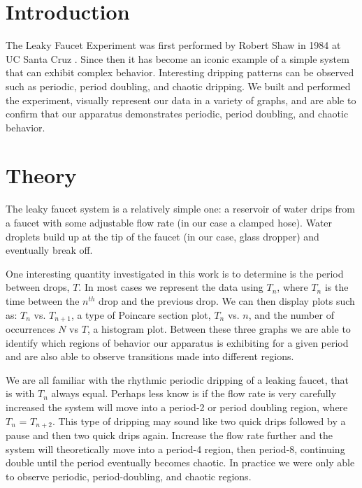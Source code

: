 \documentclass[11pt]{article}
\begin{document}
\section{Introduction} 

The Leaky Faucet Experiment was first performed by Robert Shaw in 1984 at UC Santa Cruz \cite{shaw}. Since then it has become an iconic example of a simple system that can exhibit complex behavior.  Interesting dripping patterns can be observed such as periodic, period doubling, and chaotic dripping. We built and performed the experiment, visually represent our data in a variety of graphs, and are able to confirm that our apparatus demonstrates periodic, period doubling, and chaotic behavior.



\section{Theory}
The leaky faucet system is a relatively simple one: a reservoir of water drips from a faucet with some adjustable flow rate (in our case a clamped hose). Water droplets build up at the tip of the faucet (in our case, glass dropper) and eventually break off.

One interesting quantity investigated in this work is to determine is the period between drops, $T$. In most cases we represent the data using $T_n$,  where $T_n$ is the time between the $n^{th}$ drop and the previous drop. We can then display plots such as: $T_n$ vs. $T_{n+1}$, a type of Poincare section plot, $T_n$ vs. $n$, and the number of occurrences $N$ vs $T$, a histogram plot. Between these three graphs we are able to identify which regions of behavior our apparatus is exhibiting for a given period and are also able to observe transitions made into different regions.

We are all familiar with the rhythmic periodic dripping of a leaking faucet, that is with $T_n$ always equal. Perhaps less know is if the flow rate is very carefully increased the system will move into a period-2 or period doubling region, where $T_n$ = $T_{n+2}$. This type of dripping may sound like two quick drips followed by a pause and then two quick drips again. Increase the flow rate further and the system will theoretically move into a period-4 region, then period-8, continuing double until the period eventually becomes chaotic. In practice we were only able to observe periodic, period-doubling, and chaotic regions.

\end{document}

